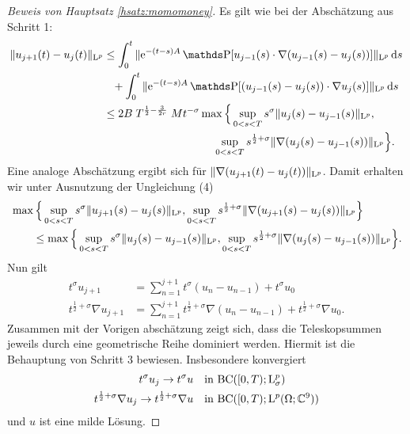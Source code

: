 \begin{proof}[Beweis von Hauptsatz \ref{hsatz:momomoney}]
  Es gilt wie bei der Abschätzung aus Schritt 1:
  \begin{align*}
    \|u_{j + 1}(t) - u_j(t)\|_{\Ell^p}
    &\leq \int_0^t \|\e^{-(t - s) A} \PP[ u_{j - 1}(s) \cdot \nabla (u_{j - 1}(s) - u_j(s))] \|_{\Ell^p} \d s \\
    &\hphantom{\leq} + \int_0^t \|\e^{-(t - s)A} \PP[ (u_{j - 1}(s) - u_j(s)) \cdot \nabla u_j(s) ] \|_{\Ell^p} \d s \\
    &\leq 2B \; T^{\frac{1}{2} - \frac{3}{2r}} \;M t^{-\sigma} \max\Big\{ \sup_{0 < s < T} s^\sigma \|u_j(s) - u_{j - 1}(s) \|_{\Ell^p},\\
    &\hphantom{2B M\; T^{\frac{1}{2} - \frac{3}{2r}} t^{-\sigma} \max\Big\{ }
    \sup_{0 < s < T} s^{\frac{1}{2} + \sigma} \|\nabla(u_j(s) - u_{j - 1}(s)) \|_{\Ell^p} \Big\}.
  \end{align*}
  Eine analoge Abschätzung ergibt sich für $\|\nabla(u_{j + 1}(t) - u_j(t)) \|_{\mathrm{L}^p}$.
  Damit erhalten wir unter Ausnutzung der Ungleichung (4)
  \begin{align*}
    &\max\Big\{\sup_{0 < s < T} s^\sigma \| u_{j + 1}(s) - u_j(s) \|_{\mathrm{L}^p}, \sup_{0 < s < T} s^{\frac{1}{2} + \sigma} \|\nabla(u_{j + 1}(s) - u_j(s)) \|_{\mathrm{L}^p} \Big\} \\
    &\qquad\leq
    \max\Big\{\sup_{0 < s < T} s^\sigma \| u_{j}(s) - u_{j - 1}(s) \|_{\mathrm{L}^p}, \sup_{0 < s < T} s^{\frac{1}{2} + \sigma} \|\nabla(u_{j}(s) - u_{j - 1}(s)) \|_{\mathrm{L}^p} \Big\}.
  \end{align*}
  Nun gilt 
  \begin{align*}
    t^\sigma u_{j + 1} &= \sum_{n = 1}^{j + 1} t^\sigma (u_n - u_{n - 1}) + t^\sigma u_0 \\
    t^{\frac{1}{2} + \sigma} \nabla u_{j + 1} &= \sum_{n = 1}^{j + 1} t^{\frac{1}{2} + \sigma} \nabla (u_n - u_{n - 1}) + t^{\frac{1}{2} + \sigma} \nabla u_0.
  \end{align*}
  Zusammen mit der Vorigen abschätzung zeigt sich, dass die Teleskopsummen jeweils durch eine geometrische Reihe dominiert werden.
  Hiermit ist die Behauptung von Schritt 3 bewiesen.
  Insbesondere konvergiert
  \begin{align*}
    t^\sigma u_j \to t^\sigma u &\quad\text{in } \mathrm{BC}([0,T); \mathrm{L}^p_\sigma) \\
      t^{\frac{1}{2} + \sigma} \nabla u_j \to t^{\frac{1}{2} + \sigma} \nabla u &\quad\text{in } \mathrm{BC}([0,T); \mathrm{L}^p(\Omega; \mathbb{C}^9))
  \end{align*}
  und $u$ ist eine milde Lösung.


\end{proof}
